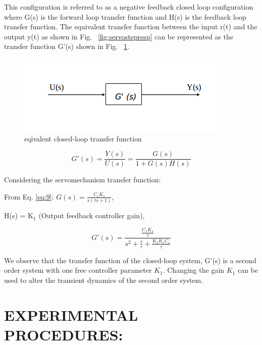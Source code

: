\documentclass[11pt,a4paper]{article}
\begin{document}
This configuration is referred to as a negative feedback closed loop configuration where G(s) is the forward loop transfer function and H(s) is the feedback loop transfer function. The equivalent transfer function between the input r(t) and the output y(t) as shown in Fig. ~\ref{fig:servostepresp} can be represented as the transfer function G'(s) shown in Fig. ~\ref{fig:servocltfblock}.

\begin{figure}[here]
\includegraphics{imglab/servocltfblock.png}
\caption{eqivalent closed-loop transfer function}
\label{fig:servocltfblock}
\end{figure}

\begin{equation} \label{eq:15}
G'(s)=\frac{Y(s)}{U(s)}=\frac{G(s)}{1+G(s)H(s)}
\end{equation}

Considering the servomechanism transfer function:

From Eq. \ref{eq:9}: $G(s)=\frac{C_{s}K_{s}}{s(\tau s + 1)}$,

H(s) = K$_{1}$ (Output feedback controller gain),

\begin{equation} \label{eq:16}
G'(s)=\frac{\frac{C_{s}K_{s}}{\tau}}{s^{2} + \frac{s}{\tau} + \frac{K_{1}K_{s}C_{s}}{\tau}}
\end{equation}

We observe that the transfer function of the closed-loop system, G'(s) is a second order system with one free controller parameter $K_{1}$. Changing the gain $K_{1}$ can be used to alter the transient dynamics of the second order system.

\section{EXPERIMENTAL PROCEDURES:}
\end{document}
